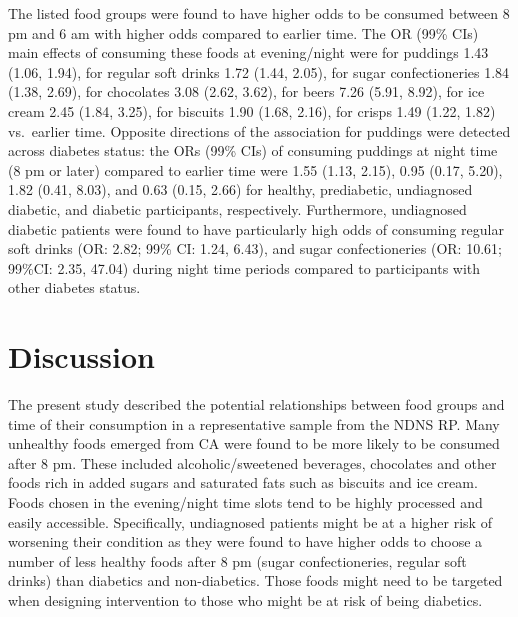 \documentclass[utf8]{frontiersSCNS}
\begin{document}
The listed food groups were found to have higher odds to be consumed
between 8 pm and 6 am with higher odds compared to earlier time. The OR
(99\% CIs) main effects of consuming these foods at evening/night were
for puddings 1.43 (1.06, 1.94), for regular soft drinks 1.72 (1.44,
2.05), for sugar confectioneries 1.84 (1.38, 2.69), for chocolates 3.08
(2.62, 3.62), for beers 7.26 (5.91, 8.92), for ice cream 2.45 (1.84,
3.25), for biscuits 1.90 (1.68, 2.16), for crisps 1.49 (1.22, 1.82)
vs.~earlier time. Opposite directions of the association for puddings
were detected across diabetes status: the ORs (99\% CIs) of consuming
puddings at night time (8 pm or later) compared to earlier time were
1.55 (1.13, 2.15), 0.95 (0.17, 5.20), 1.82 (0.41, 8.03), and 0.63 (0.15,
2.66) for healthy, prediabetic, undiagnosed diabetic, and diabetic
participants, respectively. Furthermore, undiagnosed diabetic patients
were found to have particularly high odds of consuming regular soft
drinks (OR: 2.82; 99\% CI: 1.24, 6.43), and sugar confectioneries (OR:
10.61; 99\%CI: 2.35, 47.04) during night time periods compared to
participants with other diabetes status.

\hypertarget{discussion}{%
\section*{Discussion}\label{discussion}}

The present study described the potential relationships between food
groups and time of their consumption in a representative sample from the
NDNS RP. Many unhealthy foods emerged from CA were found to be more
likely to be consumed after 8 pm. These included alcoholic/sweetened
beverages, chocolates and other foods rich in added sugars and saturated
fats such as biscuits and ice cream. Foods chosen in the evening/night
time slots tend to be highly processed and easily accessible.
Specifically, undiagnosed patients might be at a higher risk of
worsening their condition as they were found to have higher odds to
choose a number of less healthy foods after 8 pm (sugar confectioneries,
regular soft drinks) than diabetics and non-diabetics. Those foods might
need to be targeted when designing intervention to those who might be at
risk of being diabetics.
\end{document}
